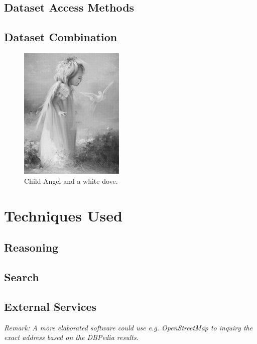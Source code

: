 \documentclass[11pt,titlepage,oneside,openany]{book}
\begin{document}
\section{Dataset Access Methods}
\label{sec:dataaccess}


\section{Dataset Combination}
\label{sec:datacomb}


\begin{figure}
	\begin{center}
	\includegraphics[width=5cm]{good.png}
	\caption[Angel]{Child Angel and a white dove.}
	\label{fig:angel}
	\end{center}
\end{figure}



\chapter{Techniques Used}
\label{cha:technique}



\section{Reasoning}
\label{sec:reasoning}


\section{Search}
\label{sec:search}

\section{External Services}
\label{sec:service}

\textit{Remark: A more elaborated software could use e.g. OpenStreetMap to inquiry the exact address based on the DBPedia results.}
\end{document}
